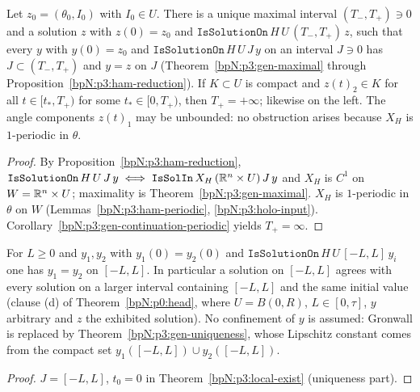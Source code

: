 \begin{theorem}\label{bpN:p3:continuation}
Let $z_0=(\theta_0,I_0)$ with $I_0\in U$. There is a unique maximal interval $(T_-,T_+)\ni0$ and a solution $z$ with
$z(0)=z_0$ and $\texttt{IsSolutionOn}\,H\,U\,(T_-,T_+)\,z$, such that every $y$ with $y(0)=z_0$ and $\texttt{IsSolutionOn}\,H\,U\,J\,y$
on an interval $J\ni0$ has $J\subset(T_-,T_+)$ and $y=z$ on $J$ (Theorem~\ref{bpN:p3:gen-maximal} through Proposition~\ref{bpN:p3:ham-reduction}).
If $K\subset U$ is compact and $z(t)_2\in K$ for all $t\in[t_*,T_+)$ for some $t_*\in[0,T_+)$, then $T_+=+\infty$; likewise on the left.
The angle components $z(t)_1$ may be unbounded: no obstruction arises because $X_H$ is $1$-periodic in $\theta$.
\end{theorem}
\begin{proof}
\label{stepN:p3:co-general} By Proposition~\ref{bpN:p3:ham-reduction}, $\texttt{IsSolutionOn}\,H\,U\,J\,y\iff\texttt{IsSolIn}\,X_H\,(\mathbb{R}^n\times U)\,J\,y$ and $X_H$ is $C^1$ on $W=\mathbb{R}^n\times U$; maximality is Theorem~\ref{bpN:p3:gen-maximal}.
\label{stepN:p3:co-periodic} $X_H$ is $1$-periodic in $\theta$ on $W$ (Lemmas~\ref{bpN:p3:ham-periodic}, \ref{bpN:p3:holo-input}). Corollary~\ref{bpN:p3:gen-continuation-periodic} yields $T_+=\infty$.
\end{proof}

\begin{theorem}\label{bpN:p3:uniqueness-closed}
For $L\ge0$ and $y_1,y_2$ with $y_1(0)=y_2(0)$ and $\texttt{IsSolutionOn}\,H\,U\,[-L,L]\,y_i$ one has $y_1=y_2$ on $[-L,L]$. In particular a solution on $[-L,L]$ agrees with every solution on a larger interval containing $[-L,L]$ and the same initial value (clause (d) of Theorem~\ref{bpN:p0:head}, where $U=B(0,R)$, $L\in[0,\tau]$, $y$ arbitrary and $z$ the exhibited solution).
No confinement of $y$ is assumed: Gronwall is replaced by Theorem~\ref{bpN:p3:gen-uniqueness}, whose Lipschitz constant comes from the compact set $y_1([-L,L])\cup y_2([-L,L])$.
\end{theorem}
\begin{proof}
\label{stepN:p3:uc-apply} $J=[-L,L]$, $t_0=0$ in Theorem~\ref{bpN:p3:local-exist} (uniqueness part).
\end{proof}

